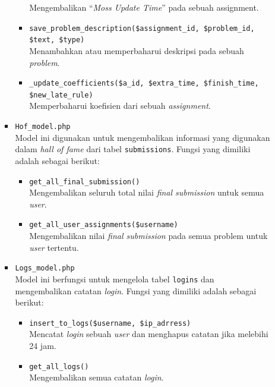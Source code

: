 \documentclass[a4paper,twoside]{article}
\begin{document}
\begin{enumerate}
\begin{itemize}
\begin{itemize}
\begin{itemize}
				                        Mengembalikan ``\textit{Moss Update Time}'' pada sebuah assignment.
				                  \item \verb|save_problem_description($assignment_id, $problem_id, $text, $type)| \\
				                        Menambahkan atau memperbaharui deskripsi pada sebuah \textit{problem}.
				                  \item \verb|_update_coefficients($a_id, $extra_time, $finish_time, $new_late_rule)| \\
				                        Memperbaharui koefisien dari sebuah \textit{assignment}.
			                  \end{itemize}

			                  \vspace{0.5cm}
			            \item \verb|Hof_model.php| \\
			                  Model ini digunakan untuk mengembalikan informasi yang digunakan dalam \textit{hall of fame} dari tabel \verb|submissions|. Fungsi yang dimiliki adalah sebagai berikut:

			                  \begin{itemize}
				                  \item \verb|get_all_final_submission()| \\
				                        Mengembalikan seluruh total nilai \textit{final submission} untuk semua \textit{user}.
				                  \item \verb|get_all_user_assignments($username)| \\
				                        Mengembalikan nilai \textit{final submission} pada semua problem untuk \textit{user} tertentu.
			                  \end{itemize}

			                  \vspace{0.5cm}
			            \item \verb|Logs_model.php| \\
			                  Model ini berfungsi untuk mengelola tabel \verb|logins| dan mengembalikan catatan \textit{login}. Fungsi yang dimiliki adalah sebagai berikut:

			                  \begin{itemize}
				                  \item \verb|insert_to_logs($username, $ip_adrress)| \\
				                        Mencatat \textit{login} sebuah \textit{user} dan menghapus catatan jika melebihi 24 jam.
				                  \item \verb|get_all_logs()| \\
				                        Mengembalikan semua catatan \textit{login}.
			                  \end{itemize}


\end{itemize}
\end{itemize}
\end{enumerate}
\end{document}
